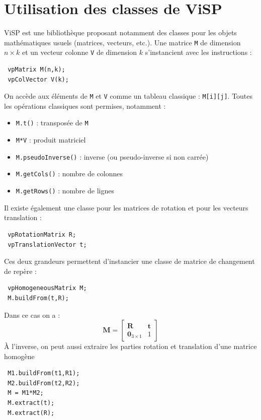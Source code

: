 \documentclass[12pt,a4paper]{article}
\begin{document}
\section{Utilisation des classes de ViSP}
\label{sec:visp}

ViSP est une bibliothèque proposant notamment des classes pour les objets mathématiques usuels (matrices, vecteurs, etc.).
Une matrice \texttt{M} de dimension $n\times k$ et un vecteur colonne \texttt{V} de dimension $k$ s'instancient avec les instructions :
\begin{verbatim}
 vpMatrix M(n,k);
 vpColVector V(k);
\end{verbatim}
On accède aux éléments de \texttt{M} et \texttt{V} comme un tableau classique : \texttt{M[i][j]}.
Toutes les opérations classiques sont permises, notamment :
\begin{itemize}
 \item \texttt{M.t()} : transposée de \texttt{M}
 \item \texttt{M*V} : produit matriciel
 \item \texttt{M.pseudoInverse()} : inverse (ou pseudo-inverse si non carrée)
 \item \texttt{M.getCols()} : nombre de colonnes
 \item \texttt{M.getRows()} : nombre de lignes
\end{itemize}
Il existe également une classe pour les matrices de rotation et pour les vecteurs translation :
\begin{verbatim}
 vpRotationMatrix R;
 vpTranslationVector t;
\end{verbatim}
Ces deux grandeurs permettent d'instancier une classe de matrice de changement de repère :
\begin{verbatim}
 vpHomogeneousMatrix M;
 M.buildFrom(t,R);
\end{verbatim}Dans ce cas on a :
\begin{equation*}
 \mathbf{M} = \left[\begin{array}{cc}
                     \mathbf{R} & \mathbf{t} \\ \mathbf{0}_{3\times 1} & 1
                    \end{array}\right]
\end{equation*}
À l'inverse, on peut aussi extraire les parties rotation et translation d'une matrice homogène
\begin{verbatim}
 M1.buildFrom(t1,R1);
 M2.buildFrom(t2,R2);
 M = M1*M2;
 M.extract(t);
 M.extract(R);
\end{verbatim}
\end{document}
